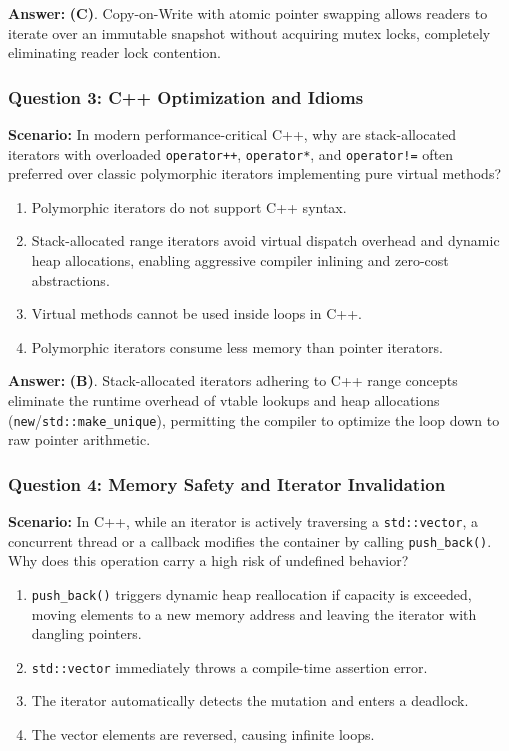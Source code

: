 \textbf{Answer:} \textbf{(C)}. Copy-on-Write with atomic pointer swapping allows readers to iterate over an immutable snapshot without acquiring mutex locks, completely eliminating reader lock contention.

\subsubsection*{Question 3: C++ Optimization and Idioms}
\textbf{Scenario:} In modern performance-critical C++, why are stack-allocated iterators with overloaded \texttt{operator++}, \texttt{operator*}, and \texttt{operator!=} often preferred over classic polymorphic iterators implementing pure virtual methods?

\begin{enumerate}[label=(\Alph*)]
    \item Polymorphic iterators do not support C++ syntax.
    \item Stack-allocated range iterators avoid virtual dispatch overhead and dynamic heap allocations, enabling aggressive compiler inlining and zero-cost abstractions.
    \item Virtual methods cannot be used inside loops in C++.
    \item Polymorphic iterators consume less memory than pointer iterators.
\end{enumerate}

\textbf{Answer:} \textbf{(B)}. Stack-allocated iterators adhering to C++ range concepts eliminate the runtime overhead of vtable lookups and heap allocations (\texttt{new}/\texttt{std::make\_unique}), permitting the compiler to optimize the loop down to raw pointer arithmetic.

\subsubsection*{Question 4: Memory Safety and Iterator Invalidation}
\textbf{Scenario:} In C++, while an iterator is actively traversing a \texttt{std::vector}, a concurrent thread or a callback modifies the container by calling \texttt{push\_back()}. Why does this operation carry a high risk of undefined behavior?

\begin{enumerate}[label=(\Alph*)]
    \item \texttt{push\_back()} triggers dynamic heap reallocation if capacity is exceeded, moving elements to a new memory address and leaving the iterator with dangling pointers.
    \item \texttt{std::vector} immediately throws a compile-time assertion error.
    \item The iterator automatically detects the mutation and enters a deadlock.
    \item The vector elements are reversed, causing infinite loops.
\end{enumerate}


